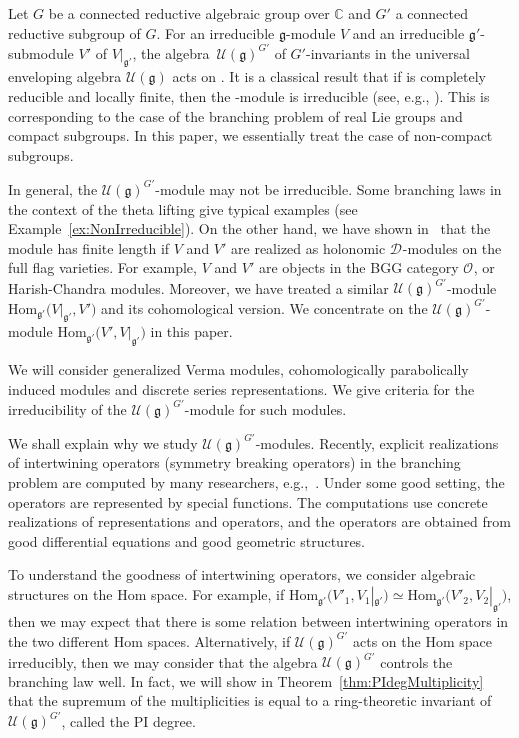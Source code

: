 \documentclass[pdftex]{sigma}
\numberwithin{equation}{section}
\theoremstyle{definition}
\newcommand{\Hom}{\mathrm{Hom}}
\newcommand{\BasicRing}[1]{\mathbb{#1}}
\newcommand{\CC}{\BasicRing{C}}
\newcommand{\lieC}[1]{\mathfrak{#1}}
\newcommand{\lie}[1]{\mathfrak{#1}}
\newcommand{\univ}[1]{\mathcal{U}(\lieC{#1})}
\newcommand{\BGGcat}[2]{\mathcal{O}_{\lie{#2}}^{\lie{#1}}}
\newcommand{\Dsheaf}[2]{\mathscr{#1}_{#2}}
\newcommand{\ntDsheaf}[1]{\Dsheaf{D}{#1}}
\begin{document}
Let $G$ be a connected reductive algebraic group over $\CC$ and $G'$ a connected reductive subgroup of $G$.
For an irreducible $\lie{g}$-module $V$ and an irreducible $\lie{g'}$-submodule $V'$ of $V|_{\lie{g'}}$, the algebra~$\univ{g}^{G'}$ of $G'$-invariants in the universal enveloping algebra $\univ{g}$ acts on \smash{$\Hom_{\lie{g'}}\bigl(V', V|_{\lie{g'}}\bigr)$}.
It is a classical result that if \smash{$V|_{\lie{g'}}$} is completely reducible and locally finite, then the \smash{$\univ{g}^{G'}$}-module is irreducible (see, e.g., \cite[\S4.2]{GoWa09}).
This is corresponding to the case of the branching problem of real Lie groups and compact subgroups.
In this paper, we essentially treat the case of non-compact subgroups.

In general, the $\univ{g}^{G'}$-module may not be irreducible.
Some branching laws in the context of the theta lifting give typical examples (see Example~\ref{ex:NonIrreducible}).
On the other hand, we have shown in~\cite[Theorem~7.18 and its corollaries]{Ki20-2} that the module has finite length if $V$ and $V'$ are realized as holonomic $\ntDsheaf{}$-modules on the full flag varieties.
For example, $V$ and $V'$ are objects in the BGG category $\BGGcat{}{}$, or Harish-Chandra modules.
Moreover, we have treated a similar $\univ{g}^{G'}$-module $\Hom_{\lie{g'}}\bigl(V|_{\lie{g'}}, V'\bigr)$ and its cohomological version.
We concentrate on the $\univ{g}^{G'}$-module $\Hom_{\lie{g'}}\bigl(V', V|_{\lie{g'}}\bigr)$ in this paper.

We will consider generalized Verma modules, cohomologically parabolically induced modules and discrete series representations.
We give criteria for the irreducibility of the $\univ{g}^{G'}$-module for such modules.

We shall explain why we study $\univ{g}^{G'}$-modules.
Recently, explicit realizations of intertwining operators (symmetry breaking operators) in the branching problem are computed by many researchers, e.g.,~\cite{KoPe15_f_method_I,KoPe15_f_method_II,KoSp15_symmetry_breaking}.
Under some good setting, the operators are represented by special functions.
The computations use concrete realizations of representations and operators, and the operators are obtained from good differential equations and good geometric structures.

To understand the goodness of intertwining operators, we consider algebraic structures on the $\Hom$ space.
For example, if $\Hom_{\lie{g'}}\bigl(V'_1, V_1|_{\lie{g'}}\bigr)\simeq \Hom_{\lie{g'}}\bigl(V'_2, V_2|_{\lie{g'}}\bigr)$,
then we may expect that there is some relation between intertwining operators in the two different $\Hom$ spaces.
Alternatively, if $\univ{g}^{G'}$ acts on the $\Hom$ space irreducibly, then we may consider that the algebra $\univ{g}^{G'}$ controls the branching law well.
In fact, we will show in Theorem~\ref{thm:PIdegMultiplicity} that the supremum of the multiplicities is equal to a ring-theoretic invariant of $\univ{g}^{G'}$, called the PI degree.
\end{document}

